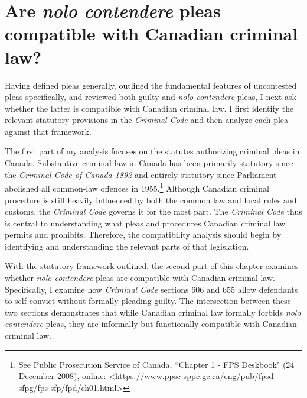 \chapter{Are \textit{nolo contendere} pleas compatible with Canadian criminal law?}

\setcounter{footnote}{95}

Having defined pleas generally, outlined the fundamental features of uncontested pleas specifically, and reviewed both guilty and \textit{nolo contendere} pleas, I next ask whether the latter is compatible with Canadian criminal law. I first identify the relevant statutory provisions in the \textit{Criminal Code} and then analyze each plea against that framework. 

The first part of my analysis focuses on the statutes authorizing criminal pleas in Canada. Substantive criminal law in Canada has been primarily statutory since the \textit{Criminal Code of Canada 1892} and entirely statutory since Parliament abolished all common-law offences in 1955.\footnote{See Public Prosecution Service of Canada, ``Chapter 1 - FPS Deskbook" (24 December 2008), online: \textless https://www.ppsc-sppc.gc.ca/eng/pub/fpsd-sfpg/fps-sfp/fpd/ch01.html\textgreater} Although Canadian criminal procedure is still heavily influenced by both the common law and local rules and customs, the \textit{Criminal Code} governs it for the most part. The \textit{Criminal Code} thus is central to understanding what pleas and procedures Canadian criminal law permits and prohibits. Therefore, the compatibility analysis should begin by identifying and understanding the relevant parts of that legislation. 

With the statutory framework outlined, the second part of this chapter examines whether \textit{nolo contendere} pleas are compatible with Canadian criminal law. Specifically, I examine how \textit{Criminal Code} sections 606 and 655 allow defendants to self-convict without formally pleading guilty. The intersection between these two sections demonstrates that while Canadian criminal law formally forbids \textit{nolo contendere} pleas, they are informally but functionally compatible with Canadian criminal law.